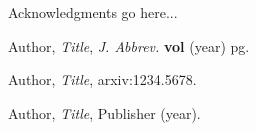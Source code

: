 \documentclass[a4paper,11pt]{article}
\begin{document}
\acknowledgments

Acknowledgments go here...







\begin{thebibliography}{99}

Author, \emph{Title}, \emph{J. Abbrev.} {\bf vol} (year) pg.

Author, \emph{Title},
arxiv:1234.5678.

Author, \emph{Title},
Publisher (year).





\end{thebibliography}
\end{document}
